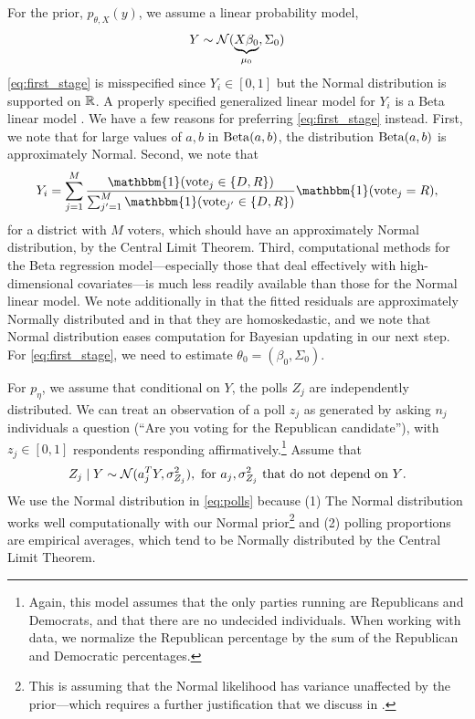 \documentclass[11pt]{article}
\begin{document}
For the prior, $p_{\theta, X}(y)$, we assume a linear probability model,
\begin{equation}
    Y \sim \mathcal{N}(\underbrace{X\beta_0}_{\mu_0}, \Sigma_0)
    \label{eq:first_stage}
\end{equation}
\eqref{eq:first_stage} is misspecified since $Y_i \in [0,1]$ but the Normal
distribution is supported on $\mathbb{R}$. A properly specified generalized linear model
for $Y_i$ is a Beta linear model \citep[See][for an overview]{grun2011extended}.
We have a few reasons for preferring \eqref{eq:first_stage} instead. First, we
note that for large values of $a,b$ in $\operatorname{Beta}(a,b)$, the distribution
$\operatorname{Beta}(a,b)$ is approximately Normal. Second, we note that \[Y_i =
\sum_{j=1}^M \frac{\mathbbm{1} (\text{vote}_j \in \{D,R\})}{\sum_{j'=1}^M \mathbbm{1}
(\text{vote}_{j'} \in \{D,R\})} \mathbbm{1}(\text{vote}_j = R),\] for a district with
$M$ voters, which should have an approximately Normal distribution, by the
Central Limit Theorem. Third, computational methods for the Beta regression
model---especially those that deal effectively with high-dimensional
covariates---is much less readily available than those for the Normal linear
model. We note additionally in  that the fitted residuals are
approximately Normally distributed and in  that they are homoskedastic, and we note that Normal distribution eases
computation for Bayesian updating in our next step. For \eqref{eq:first_stage},
we need to estimate $\theta_0 = (\beta_0, \Sigma_0)$. 

For $p_{\eta}$, we assume that conditional on $Y$, the polls $Z_j$ are
independently distributed. We can treat an observation of a poll $z_j$ as
generated by
asking $n_j$
individuals a question (``Are you voting for the Republican candidate''), with
$z_j \in [0,1]$ respondents responding
affirmatively.\footnote{Again, this model assumes that the only parties running
are Republicans and Democrats, and that there are no undecided individuals.
When working with data, we normalize the Republican percentage by the sum of
the Republican and Democratic percentages.}
Assume that 
\begin{equation}
    Z_j \mid Y \sim \mathcal{N}(a_j^T Y, \sigma_{Z_j}^2), \text{ for $a_j, \sigma_
    {Z_j}^2$ that do not depend on $Y$}.
    \label{eq:polls}
\end{equation}
We use the Normal distribution in \eqref{eq:polls} because (1) The Normal
distribution works well computationally with our Normal prior\footnote{This is
assuming that the Normal likelihood has variance unaffected by the
prior---which requires a further justification that we discuss in 
.} and (2) polling proportions are empirical averages, which
tend to be Normally distributed by the Central Limit Theorem.
\end{document}
